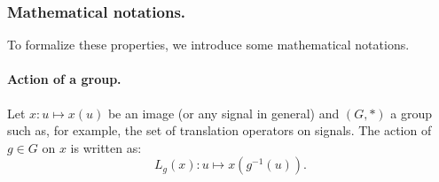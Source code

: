         \subsubsection{Mathematical notations.}
            To formalize these properties, we introduce some mathematical notations.
            \paragraph{Action of a group.}
                Let $x: u \mapsto x(u)$ be an image (or any signal in general) and $(G, *)$ a group such as, for example, the set of translation operators on signals.
                The action of $g\in G$ on $x$ is written as:
                \begin{equation}
                    \label{eq::action_group}
                    L_g(x): u \mapsto x\left(g^{-1}(u)\right).
                \end{equation}
            
